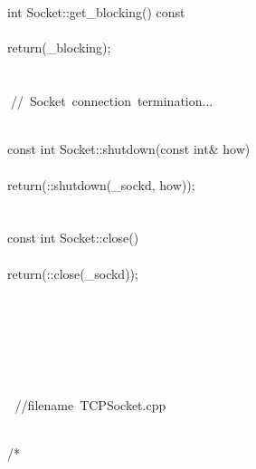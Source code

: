 \documentclass{article}
\begin{document}
\\
 
\\
 int Socket::get_blocking() const
\\
 {
\\
     return(_blocking);
\\
 }
\\
 
\\
 
\hbox{// Socket connection termination...}\strut\\
 const int Socket::shutdown(const int& how)
\\
 {
\\
         return(::shutdown(_sockd, how));
\\
 }
\\
 
\\
 const int Socket::close()
\\
 {
\\
         return(::close(_sockd));
\\
 }
\\
 
\\
 
\\
\strut\\
\strut\goodbreak
{}\strut\nopagebreak\\
 
\hbox{//$$filename TCPSocket.cpp}\strut\\
\hbox{/*}
\end{document}
